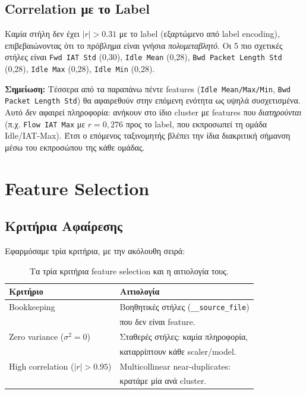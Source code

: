 \documentclass[12pt,a4paper,twoside]{book}
\begin{document}
\subsection{Correlation με το Label}

Καμία στήλη δεν έχει \(|r| > 0.31\) με το label (εξαρτώμενο από label
encoding), επιβεβαιώνοντας ότι το πρόβλημα είναι γνήσια \emph{πολυμεταβλητό}.
Οι 5 πιο σχετικές στήλες είναι \texttt{Fwd IAT Std} (0,30),
\texttt{Idle Mean} (0,28), \texttt{Bwd Packet Length Std} (0,28),
\texttt{Idle Max} (0,28), \texttt{Idle Min} (0,28).

\textbf{Σημείωση:} Τέσσερα από τα παραπάνω πέντε features (\texttt{Idle
Mean/Max/Min}, \texttt{Bwd Packet Length Std}) θα αφαιρεθούν στην επόμενη
ενότητα ως υψηλά συσχετισμένα. Αυτό \emph{δεν} αφαιρεί πληροφορία: ανήκουν
στο ίδιο cluster με features που \emph{διατηρούνται} (π.χ.
\texttt{Flow IAT Max} με \(r=0{,}276\) προς το label, που εκπροσωπεί τη
ομάδα Idle/IAT-Max). Έτσι ο επόμενος ταξινομητής βλέπει την ίδια διακριτική
σήμανση μέσω του εκπροσώπου της κάθε ομάδας.

\section{Feature Selection}

\subsection{Κριτήρια Αφαίρεσης}

Εφαρμόσαμε τρία κριτήρια, με την ακόλουθη σειρά:

\begin{table}[H]
    \centering
    \small
    \begin{tabular}{p{4cm}p{8cm}}
        \toprule
        \textbf{Κριτήριο}                    & \textbf{Αιτιολογία}                                \\
        \midrule
        Bookkeeping                          & Βοηθητικές στήλες (\texttt{\_\_source\_file})      \\
                                             & που δεν είναι feature.                             \\
        \midrule
        Zero variance (\(\sigma^2=0\))       & Σταθερές στήλες: καμία πληροφορία,                 \\
                                             & καταρρίπτουν κάθε scaler/model.                    \\
        \midrule
        High correlation (\(|r|>0.95\))      & Multicollinear near-duplicates:                    \\
                                             & κρατάμε μία ανά cluster.                           \\
        \bottomrule
    \end{tabular}
    \caption{Τα τρία κριτήρια feature selection και η αιτιολογία τους.}
    \label{tab:selection_criteria}
\end{table}
\end{document}
